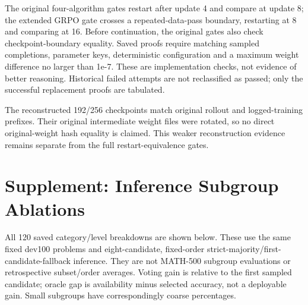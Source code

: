 The original four-algorithm gates restart after update 4 and compare at update 8; the extended GRPO gate crosses a repeated-data-pass boundary, restarting at 8 and comparing at 16. Before continuation, the original gates also check checkpoint-boundary equality. Saved proofs require matching sampled completions, parameter keys, deterministic configuration and a maximum weight difference no larger than 1e-7. These are implementation checks, not evidence of better reasoning. Historical failed attempts are not reclassified as passed; only the successful replacement proofs are tabulated.

The reconstructed 192/256 checkpoints match original rollout and logged-training prefixes. Their original intermediate weight files were rotated, so no direct original-weight hash equality is claimed. This weaker reconstruction evidence remains separate from the full restart-equivalence gates.

\clearpage

\section{Supplement: Inference Subgroup Ablations}

All 120 saved category/level breakdowns are shown below. These use the same fixed dev100 problems and eight-candidate, fixed-order strict-majority/first-candidate-fallback inference. They are not MATH-500 subgroup evaluations or retrospective subset/order averages. Voting gain is relative to the first sampled candidate; oracle gap is availability minus selected accuracy, not a deployable gain. Small subgroups have correspondingly coarse percentages.

